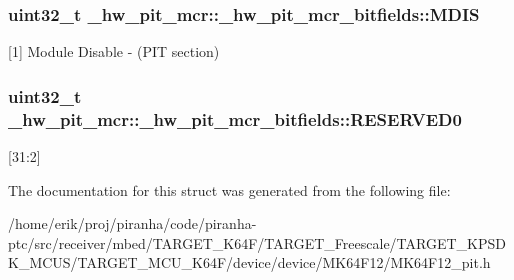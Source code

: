 \subsubsection[{\texorpdfstring{M\+D\+IS}{MDIS}}]{\setlength{\rightskip}{0pt plus 5cm}uint32\+\_\+t \+\_\+hw\+\_\+pit\+\_\+mcr\+::\+\_\+hw\+\_\+pit\+\_\+mcr\+\_\+bitfields\+::\+M\+D\+IS}\hypertarget{struct__hw__pit__mcr_1_1__hw__pit__mcr__bitfields_a01a3e4b24e739a93559063480625821c}{}\label{struct__hw__pit__mcr_1_1__hw__pit__mcr__bitfields_a01a3e4b24e739a93559063480625821c}
\mbox{[}1\mbox{]} Module Disable -\/ (P\+IT section) 
\subsubsection[{\texorpdfstring{R\+E\+S\+E\+R\+V\+E\+D0}{RESERVED0}}]{\setlength{\rightskip}{0pt plus 5cm}uint32\+\_\+t \+\_\+hw\+\_\+pit\+\_\+mcr\+::\+\_\+hw\+\_\+pit\+\_\+mcr\+\_\+bitfields\+::\+R\+E\+S\+E\+R\+V\+E\+D0}\hypertarget{struct__hw__pit__mcr_1_1__hw__pit__mcr__bitfields_ad4ae1856cd1e546f5f5f9f5885afa808}{}\label{struct__hw__pit__mcr_1_1__hw__pit__mcr__bitfields_ad4ae1856cd1e546f5f5f9f5885afa808}
\mbox{[}31\+:2\mbox{]} 

The documentation for this struct was generated from the following file\+:\begin{DoxyCompactItemize}
\item 
/home/erik/proj/piranha/code/piranha-\/ptc/src/receiver/mbed/\+T\+A\+R\+G\+E\+T\+\_\+\+K64\+F/\+T\+A\+R\+G\+E\+T\+\_\+\+Freescale/\+T\+A\+R\+G\+E\+T\+\_\+\+K\+P\+S\+D\+K\+\_\+\+M\+C\+U\+S/\+T\+A\+R\+G\+E\+T\+\_\+\+M\+C\+U\+\_\+\+K64\+F/device/device/\+M\+K64\+F12/M\+K64\+F12\+\_\+pit.\+h\end{DoxyCompactItemize}
